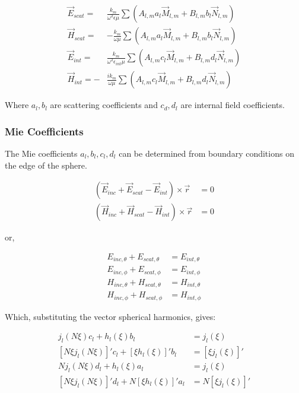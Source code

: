         \begin{align}
            \vec{E}_{scat}=& \frac{k_m}{\omega^2\epsilon\mu}\sum\left(A_{l,m}a_l\vec{M}_{l,m} + B_{l,m}b_l\vec{N}_{l,m}\right)\\
            \vec{H}_{scat}=&-\frac{k_m}{\omega\mu}\sum\left(A_{l,m}a_l\vec{M}_{l,m} + B_{l,m}b_l\vec{N}_{l,m}\right)\\
            \vec{E}_{int}=&\frac{k_m}{\omega^2\epsilon_{int}\mu}\sum\left(A_{l,m}c_l\vec{M}_{l,m} + B_{l,m}d_l\vec{N}_{l,m}\right)\\
            \vec{H}_{int}=-&\frac{ik_m}{\omega\mu}\sum\left(A_{l,m}c_l\vec{M}_{l,m} + B_{l,m}d_l\vec{N}_{l,m}\right)
        \end{align}

        Where $a_l, b_l$ are scattering coefficients and $c_d, d_l$ are internal field coefficients.

    \subsubsection{Mie Coefficients}

        The Mie coefficients $a_l, b_l, c_l, d_l$ can be determined from boundary conditions on the edge of the sphere.

        \begin{align}
            \left( \vec{E}_{inc} + \vec{E}_{scat} - \vec{E}_{int} \right) \times \vec{r} &= 0 \\
            \left( \vec{H}_{inc} + \vec{H}_{scat} - \vec{H}_{int} \right) \times \vec{r} &= 0
        \end{align}

        or,

        \begin{align}
            E_{inc,\theta} + E_{scat,\theta} &= E_{int, \theta} \\
            E_{inc,\phi} + E_{scat,\phi} &= E_{int, \phi} \\
            H_{inc,\theta} + H_{scat,\theta} &= H_{int, \theta} \\
            H_{inc,\phi} + H_{scat,\phi} &= H_{int, \phi}
        \end{align}

        Which, substituting the vector spherical harmonics, gives:

        \begin{align}
            j_l(N\xi)c_l + h_l(\xi)b_l&=j_l(\xi)\\
            [N\xi j_l(N\xi)]'c_l+ [\xi h_l(\xi)]'b_l&= [\xi j_l(\xi)]'\\
            Nj_l(N\xi)d_l + h_l(\xi)a_l &= j_l(\xi)\\
            [N\xi j_l(N\xi)]'d_l +N[\xi h_l(\xi)]'a_l &= N[\xi j_l(\xi)]'
        \end{align}

